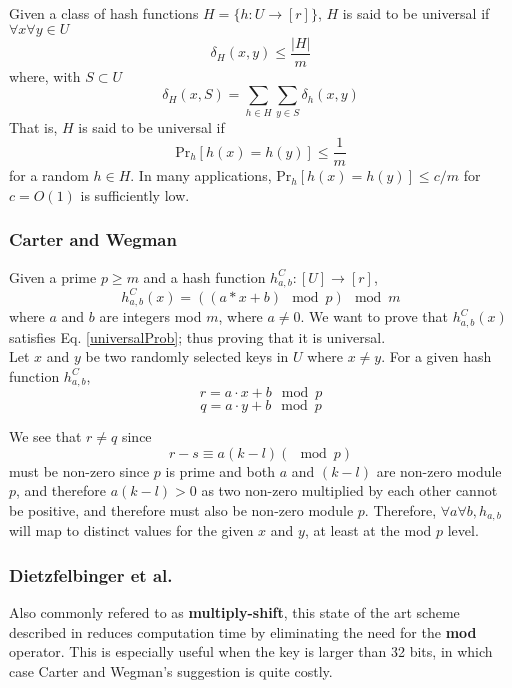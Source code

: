 \documentclass[../../main.tex]{subfiles}
\begin{document}
Given a class of hash functions $H = \{h:U\rightarrow [r]\}$, $H$ is said to be universal if $\forall x \forall y \in U$
$$
	\delta_H (x,y) \leq \frac{|H|}{m}
$$
where, with $S\subset U$
$$
\delta_H (x,S) = \sum_{h\in H}\sum_{y\in S} \delta_h(x,y)
$$
That is, $H$ is said to be universal if 
\begin{equation}\label{universalProb}
\mathrm{Pr}_h[h(x)=h(y)]\leq \frac{1}{m}
\end{equation}
for a random $h \in H$.
In many applications, Pr$_h[h(x)=h(y)]\leq c/m$ for $c=O(1)$ is sufficiently low.

\subsubsection{Carter and Wegman\cite{carterWegman}}
Given a prime $p\geq m$ and a hash function $h_{a,b}^C:[U]\rightarrow [r]$,
\begin{equation}\label{carterhash}
h_{a,b}^{C}(x)=((a*x + b) \mod p) \mod m
\end{equation}
where $a$ and $b$ are integers mod $m$, where $a\neq 0$. We want to prove that $h_{a,b}^{C}(x)$ satisfies Eq. \ref{universalProb}; thus proving that it is universal.\\

\noindent Let $x$ and $y$ be two randomly selected keys in $U$ where $x\neq y$. For a given hash function $h_{a,b}^{C}$,
$$
r = a\cdot x + b \mod p
$$
$$
q = a \cdot y + b \mod p
$$

\noindent We see that $r\neq q$ since 
$$
r - s \equiv a(k-l) ( \mod p)
$$
must be non-zero since $p$ is prime and both $a$ and $(k-l)$ are non-zero module $p$, and therefore $a(k-l) > 0$ as two non-zero multiplied by each other cannot be positive, and therefore must also be non-zero module $p$.
Therefore, $\forall a\forall b, h_{a,b}$ will map to distinct values for the given $x$ and $y$, at least at the mod $p$ level.

\subsubsection{Dietzfelbinger et al.\cite{Dietzfelbinger}}
Also commonly refered to as \textbf{multiply-shift}, this state of the art scheme described in \cite{Dietzfelbinger} reduces computation time by eliminating the need for the \textbf{mod} operator. This is especially useful when the key is larger than 32 bits, in which case Carter and Wegman's suggestion is quite costly\cite{dikuHash}.\\
\end{document}
